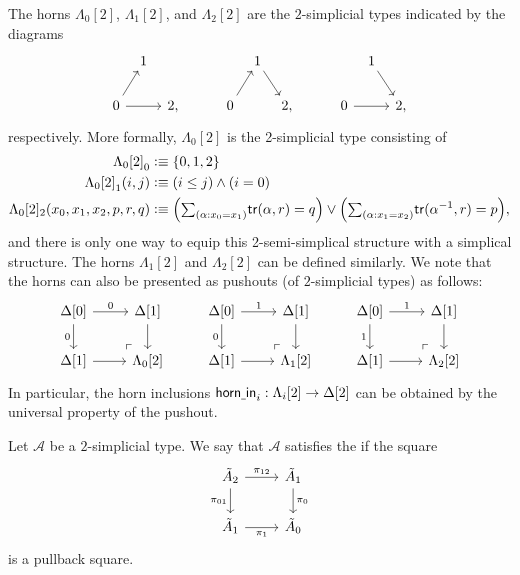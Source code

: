 \begin{eg}
The horns $\Lambda_0[2]$, $\Lambda_1[2]$, and $\Lambda_2[2]$ are the $2$-simplicial types indicated by the diagrams
\begin{equation*}
\begin{tikzcd}[column sep=tiny]
& 1 & &[2em] & 1 \arrow[dr] & &[2em] & 1 \arrow[dr] \\
0 \arrow[ur] \arrow[rr] & & 2, & 0 \arrow[ur] & & 2, & 0 \arrow[rr] & & 2,
\end{tikzcd}
\end{equation*}
respectively. More formally, $\Lambda_0[2]$ is the 2-simplicial type consisting of
\begin{align*}
\pts{\Lambda_0[2]} & \defeq \{0,1,2\} \\
\edg{\Lambda_0[2]}(i,j) & \defeq (i\leq j)\land (i=0) \\
\Lambda_0[2]_2(x_0,x_1,x_2,p,r,q) & \defeq \Big(\sm{\alpha:x_0=x_1}\mathsf{tr}(\alpha,r)=q\Big)\vee\Big(\sm{\alpha:x_1=x_2}\mathsf{tr}(\alpha^{-1},r)=p\Big),
\end{align*}
and there is only one way to equip this 2-semi-simplical structure with a simplical structure.
The horns $\Lambda_1[2]$ and $\Lambda_2[2]$ can be defined similarly. We note that the horns can also be presented as pushouts (of $2$-simplicial types) as follows:
\begin{equation*}
\begin{tikzcd}
\Delta[0] \arrow[r,"0"] \arrow[d,swap,"0"] \arrow[dr,phantom,"\ulcorner" at end] & \Delta[1] \arrow[d] & \Delta[0] \arrow[r,"1"] \arrow[d,swap,"0"] \arrow[dr,phantom,"\ulcorner" at end] & \Delta[1] \arrow[d] & \Delta[0] \arrow[r,"1"] \arrow[d,swap,"1"] \arrow[dr,phantom,"\ulcorner" at end] & \Delta[1] \arrow[d] \\
\Delta[1] \arrow[r] & \Lambda_0[2] & \Delta[1] \arrow[r] & \Lambda_1[2] & \Delta[1] \arrow[r] & \Lambda_2[2]
\end{tikzcd}
\end{equation*}
In particular, the horn inclusions $\mathsf{horn\underline{\ }{}in}_i:\Lambda_i[2]\to \Delta[2]$ can be obtained by the universal property of the pushout.
\end{eg}

\begin{defn}
Let $\mathcal{A}$ be a $2$-simplicial type. We say that $\mathcal{A}$ satisfies the  if the square
\begin{equation*}
\begin{tikzcd}
\tilde{A}_2 \arrow[r,"\pi_{12}"] \arrow[d,swap,"\pi_{01}"] & \tilde{A}_1 \arrow[d,"\pi_0"] \\
\tilde{A}_1 \arrow[r,swap,"\pi_1"] & \tilde{A}_0
\end{tikzcd}
\end{equation*}
is a pullback square.
\end{defn}

